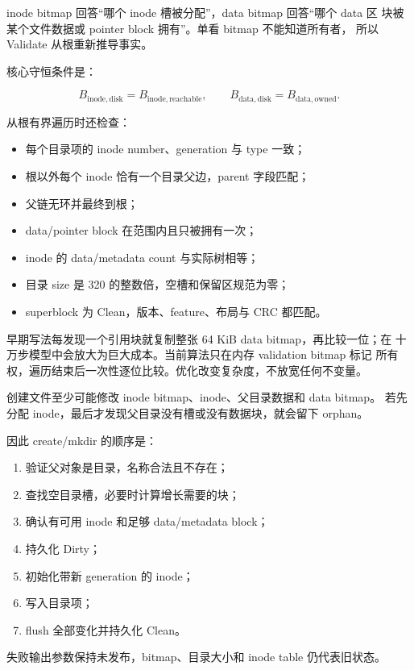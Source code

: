 inode bitmap 回答“哪个 inode 槽被分配”，data bitmap 回答“哪个 data 区
块被某个文件数据或 pointer block 拥有”。单看 bitmap 不能知道所有者，
所以 Validate 从根重新推导事实。

核心守恒条件是：

\[
  B_{\mathrm{inode,disk}}=B_{\mathrm{inode,reachable}},
  \qquad
  B_{\mathrm{data,disk}}=B_{\mathrm{data,owned}}.
\]

从根有界遍历时还检查：

\begin{itemize}
  \item 每个目录项的 inode number、generation 与 type 一致；
  \item 根以外每个 inode 恰有一个目录父边，parent 字段匹配；
  \item 父链无环并最终到根；
  \item data/pointer block 在范围内且只被拥有一次；
  \item inode 的 data/metadata count 与实际树相等；
  \item 目录 size 是 320 的整数倍，空槽和保留区规范为零；
  \item superblock 为 Clean，版本、feature、布局与 CRC 都匹配。
\end{itemize}

早期写法每发现一个引用块就复制整张 64 KiB data bitmap，再比较一位；在
十万步模型中会放大为巨大成本。当前算法只在内存 validation bitmap 标记
所有权，遍历结束后一次性逐位比较。优化改变复杂度，不放宽任何不变量。

创建文件至少可能修改 inode bitmap、inode、父目录数据和 data bitmap。
若先分配 inode，最后才发现父目录没有槽或没有数据块，就会留下 orphan。

因此 create/mkdir 的顺序是：

\begin{enumerate}
  \item 验证父对象是目录，名称合法且不存在；
  \item 查找空目录槽，必要时计算增长需要的块；
  \item 确认有可用 inode 和足够 data/metadata block；
  \item 持久化 Dirty；
  \item 初始化带新 generation 的 inode；
  \item 写入目录项；
  \item flush 全部变化并持久化 Clean。
\end{enumerate}

失败输出参数保持未发布，bitmap、目录大小和 inode table 仍代表旧状态。

